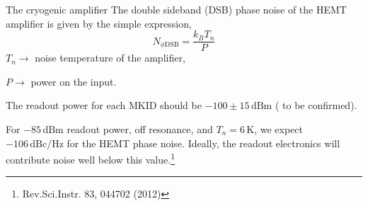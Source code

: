 \documentclass[ignorenonframetext,12pt]{beamer}
\begin{document}
\begin{frame}{The cryogenic amplifier}
				The double sideband (DSB) phase noise of the HEMT
			amplifier is given by the simple expression, 
			{\color{red}
			\begin{equation*}
							N_{\phi \text{DSB}} = \frac{k_B T_n}{P}
			\end{equation*}} 
			\flushleft
			$T_n \to$ noise temperature of the amplifier, 

			$P \to$ power on the input. 

			The readout power for each MKID should be $-100 \pm
			15\,\text{dBm}$ ({\color{red} to be confirmed}). 

			For	$-85\,\text{dBm}$ readout power, off resonance, and $T_n
			= 6\,\text{K}$, we expect $-106\,\text{dBc/Hz}$ for the
			HEMT phase noise. Ideally, the readout electronics will
			contribute noise well below this
			value.\footnote{Rev.Sci.Instr. 83, 044702 (2012)}
\end{frame}
\end{document}
